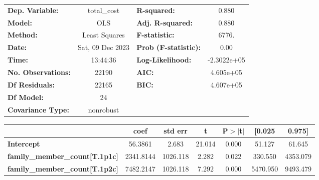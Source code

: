 \documentclass{report}
\begin{document}
\begin{center}
\begin{tabular}{lclc}
\toprule
\textbf{Dep. Variable:}                                       &   total\_cost    & \textbf{  R-squared:         } &      0.880   \\
\textbf{Model:}                                               &       OLS        & \textbf{  Adj. R-squared:    } &      0.880   \\
\textbf{Method:}                                              &  Least Squares   & \textbf{  F-statistic:       } &      6776.   \\
\textbf{Date:}                                                & Sat, 09 Dec 2023 & \textbf{  Prob (F-statistic):} &      0.00    \\
\textbf{Time:}                                                &     13:44:36     & \textbf{  Log-Likelihood:    } & -2.3022e+05  \\
\textbf{No. Observations:}                                    &       22190      & \textbf{  AIC:               } &  4.605e+05   \\
\textbf{Df Residuals:}                                        &       22165      & \textbf{  BIC:               } &  4.607e+05   \\
\textbf{Df Model:}                                            &          24      & \textbf{                     } &              \\
\textbf{Covariance Type:}                                     &    nonrobust     & \textbf{                     } &              \\
\bottomrule
\end{tabular}
\begin{tabular}{lcccccc}
                                                              & \textbf{coef} & \textbf{std err} & \textbf{t} & \textbf{P$> |$t$|$} & \textbf{[0.025} & \textbf{0.975]}  \\
\midrule
\textbf{Intercept}                                            &      56.3861  &        2.683     &    21.014  &         0.000        &       51.127    &       61.645     \\
\textbf{family\_member\_count[T.1p1c]}                        &    2341.8144  &     1026.118     &     2.282  &         0.022        &      330.550    &     4353.079     \\
\textbf{family\_member\_count[T.1p2c]}                        &    7482.2147  &     1026.118     &     7.292  &         0.000        &     5470.950    &     9493.479     \\

\end{tabular}
\end{center}
\end{document}

